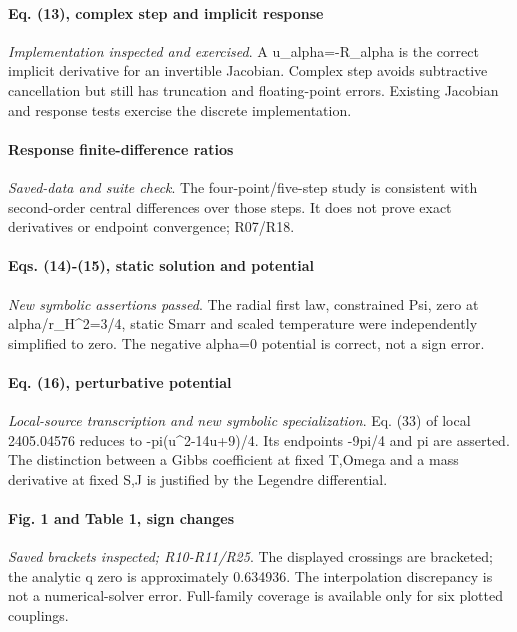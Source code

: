\documentclass[10pt,a4paper]{article}
\begin{document}
\paragraph{Eq. (13), complex step and implicit response} \textit{Implementation inspected and exercised}. A u\_alpha=-R\_alpha is the correct implicit derivative for an invertible Jacobian. Complex step avoids subtractive cancellation but still has truncation and floating-point errors. Existing Jacobian and response tests exercise the discrete implementation.

\paragraph{Response finite-difference ratios} \textit{Saved-data and suite check}. The four-point/five-step study is consistent with second-order central differences over those steps. It does not prove exact derivatives or endpoint convergence; R07/R18.

\paragraph{Eqs. (14)-(15), static solution and potential} \textit{New symbolic assertions passed}. The radial first law, constrained Psi, zero at alpha/r\_H\textasciicircum{}2=3/4, static Smarr and scaled temperature were independently simplified to zero. The negative alpha=0 potential is correct, not a sign error.

\paragraph{Eq. (16), perturbative potential} \textit{Local-source transcription and new symbolic specialization}. Eq. (33) of local 2405.04576 reduces to -pi(u\textasciicircum{}2-14u+9)/4. Its endpoints -9pi/4 and pi are asserted. The distinction between a Gibbs coefficient at fixed T,Omega and a mass derivative at fixed S,J is justified by the Legendre differential.

\paragraph{Fig. 1 and Table 1, sign changes} \textit{Saved brackets inspected; R10-R11/R25}. The displayed crossings are bracketed; the analytic q zero is approximately 0.634936. The interpolation discrepancy is not a numerical-solver error. Full-family coverage is available only for six plotted couplings.
\end{document}

